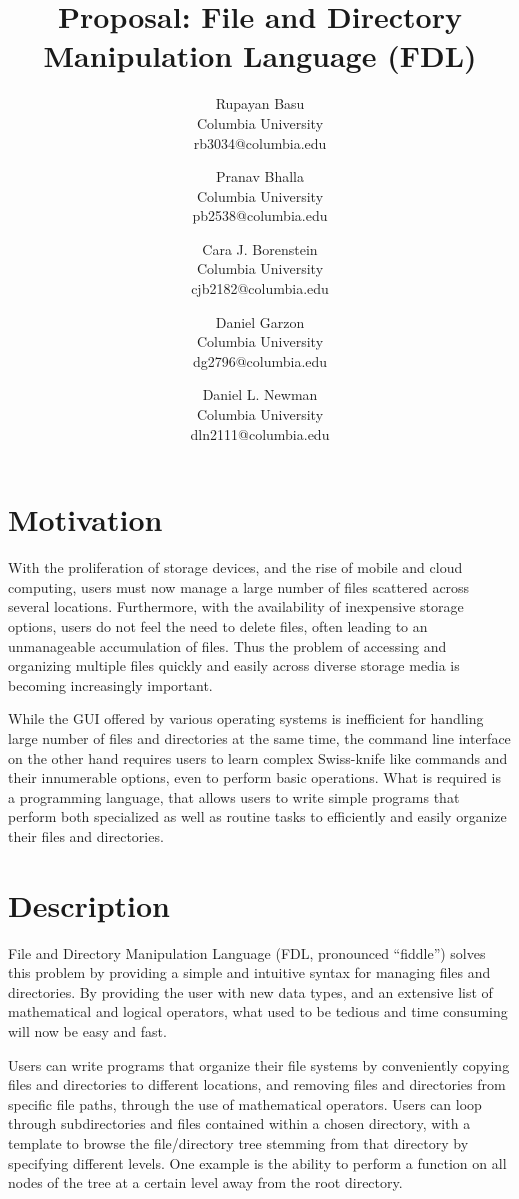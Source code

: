 \documentclass[11pt]{article}
\title{\textbf{\huge Proposal: File and Directory Manipulation Language (FDL)}}
\author{
  Rupayan Basu\\
  Columbia University\\
  rb3034@columbia.edu
  \and
  Pranav Bhalla\\
  Columbia University\\
  pb2538@columbia.edu
  \and
  Cara J. Borenstein\\
  Columbia University\\
  cjb2182@columbia.edu
  \and
  Daniel Garzon\\
  Columbia University\\
  dg2796@columbia.edu
  \and
  Daniel L. Newman\\
  Columbia University\\
  dln2111@columbia.edu
}
\begin{document}
\maketitle


\section{Motivation}
With the proliferation of storage devices, and the rise of mobile and cloud computing, users must now manage a large number of files scattered across several locations. Furthermore, with the availability of inexpensive storage options, users do not feel the need to delete files, often leading to an unmanageable accumulation of files. Thus the problem of accessing and organizing multiple files quickly and easily across diverse storage media is becoming increasingly important.

While the GUI offered by various operating systems is inefficient for handling large number of files and directories at the same time, the command line interface on the other hand requires users to learn complex Swiss-knife like commands and their innumerable options, even to perform basic operations. What is required is a programming language, that allows users to write simple programs that perform both specialized as well as routine tasks to efficiently and easily organize their files and directories.

\section{Description}
File and Directory Manipulation Language (FDL, pronounced “fiddle”)  solves this problem by providing a simple and intuitive syntax for managing files and directories. By providing the user with new data types, and an extensive list of mathematical and logical operators, what used to be tedious and time consuming will now be easy and fast.

Users can write programs that organize their file systems by conveniently copying files and directories to different locations, and removing files and directories from specific file paths, through the use of mathematical operators. Users can loop through subdirectories and files contained within a chosen directory, with a template to browse the file/directory tree stemming from that directory by specifying different levels. One example is the ability to perform a function on all nodes of the tree at a certain level away from the root directory.
\end{document}

